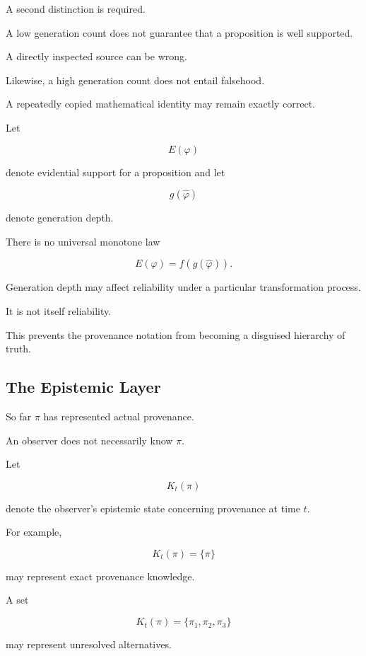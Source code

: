\documentclass[
  11pt,
  a4paper,
  DIV=12,
  BCOR=0mm,
  parskip=half-
]{scrartcl}
\theoremstyle{definition}
\theoremstyle{plain}
\theoremstyle{remark}
\begin{document}
A second distinction is required.

A low generation count does not guarantee that a proposition is well
supported.

A directly inspected source can be wrong.

Likewise, a high generation count does not entail falsehood.

A repeatedly copied mathematical identity may remain exactly correct.

Let

\[
  E(\varphi)
\]

denote evidential support for a proposition and let

\[
  g(\widehat\varphi)
\]

denote generation depth.

There is no universal monotone law

\[
  E(\varphi)=f(g(\widehat\varphi)).
\]

Generation depth may affect reliability under a particular transformation
process.

It is not itself reliability.

This prevents the provenance notation from becoming a disguised hierarchy of
truth.


\subsection{The Epistemic Layer}
\label{app:epistemic-provenance}

So far \(\pi\) has represented actual provenance.

An observer does not necessarily know \(\pi\).

Let

\[
  K_t(\pi)
\]

denote the observer's epistemic state concerning provenance at time \(t\).

For example,

\[
  K_t(\pi)
  =
  \{\pi\}
\]

may represent exact provenance knowledge.

A set

\[
  K_t(\pi)
  =
  \{
    \pi_1,\pi_2,\pi_3
  \}
\]

may represent unresolved alternatives.
\end{document}
